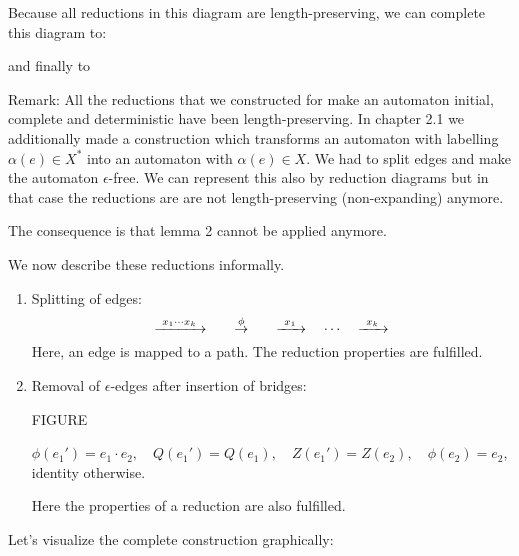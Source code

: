 Because all reductions in this diagram are length-preserving, we can complete
this diagram to:

\begin{center}
\end{center}

and finally to

\begin{center}
\end{center}

Remark: All the reductions that we constructed for make an automaton initial,
complete and deterministic have been length-preserving. In chapter 2.1 we
additionally made a construction which transforms an automaton with labelling
$\alpha(e) \in X^*$ into an automaton with $\alpha(e) \in X$. We had to split
edges and make the automaton $\epsilon$-free. We can represent this also by
reduction diagrams but in that case the reductions are are not length-preserving
(non-expanding) anymore.

The consequence is that lemma 2 cannot be applied anymore.

We now describe these reductions informally.

\begin{enumerate}
  \item Splitting of edges:
  \[ \xrightarrow{\ {x_1 \cdots x_k}\ } \qquad\stackrel{\phi}{\to}\qquad \xrightarrow{\ {x_1}\ }\quad
  \cdots\quad \xrightarrow{\ {x_k}\ } \] Here, an edge is mapped to a path. The reduction
  properties are fulfilled.
  \item Removal of $\epsilon$-edges after insertion of bridges:
  
  FIGURE
  
  $\phi(e_1') = e_1 \cdot e_2,\quad Q(e_1') = Q(e_1),\quad Z(e_1') =
  Z(e_2),\quad \phi(e_2) = e_2$, identity otherwise.
  
  Here the properties of a reduction are also fulfilled.
\end{enumerate}

Let's visualize the complete construction graphically:

